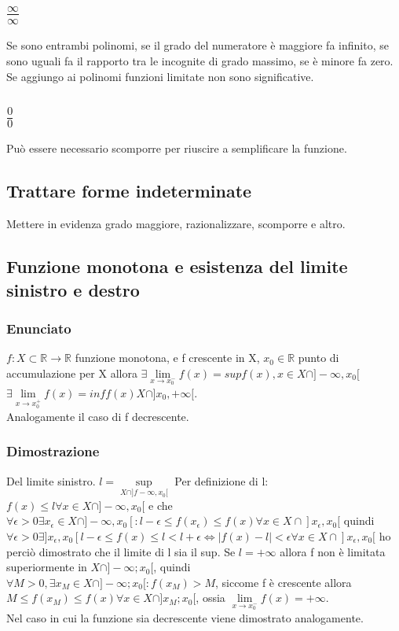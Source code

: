 \subsection{$\frac{\infty}{\infty}$}
Se sono entrambi polinomi, se il grado del numeratore \`e maggiore fa infinito, se sono uguali fa il rapporto tra le incognite di grado massimo, se \`e minore fa zero.
Se aggiungo ai polinomi funzioni limitate non sono significative.
\subsection{$\frac{0}{0}$}
Pu\`o essere necessario scomporre per riuscire a semplificare la funzione.
\subsection{Trattare forme indeterminate}
Mettere in evidenza grado maggiore, razionalizzare, scomporre e altro.
\subsection{Funzione monotona e esistenza del limite sinistro e destro}
\subsubsection{Enunciato}
$f:X\subset\mathbb{R}\rightarrow\mathbb{R}$ funzione monotona, e f crescente in X, $x_0\in\mathbb{R}$ punto di accumulazione per X allora $\exists\lim\limits_{x\rightarrow x^-_0}
f(x)=sup f(x), x\in X\cap]-\infty, x_0[$\\
$\exists\lim\limits_{x\rightarrow x^+_0}f(x)=inf f(x) X\cap]x_0,+\infty[$.\\
Analogamente il caso di f decrescente.\\
\subsubsection{Dimostrazione}
Del limite sinistro. $l=\sup\limits_{X\cap]f-\infty, x_0[}$ Per definizione di l: $f(x)\le l \forall x\in X\cap]-\infty, x_0[$ e che $\forall \epsilon>0\exists x_\epsilon\in X
\cap]-\infty, x_0[: l-\epsilon\le f(x_\epsilon)\le f(x) \forall x\in X\cap]x_\epsilon, x_0[$ quindi $\forall\epsilon>0 \exists ]x_\epsilon, x_0[ l-\epsilon \le f(x)\le l<l+\epsilon\Leftrightarrow|f(x)-l|<\epsilon \forall x\in X\cap ]x_\epsilon, x_0[$ ho perci\`o dimostrato che il limite di l sia il sup. Se $l=+\infty$ allora f non \`e limitata
superiormente in $X\cap]-\infty;x_0[$, quindi $\forall M>0,\exists x_M\in X\cap]-\infty;x_0[:f(x_M)>M$, siccome f \`e crescente allora $M\le f(x_M)\le f(x)\forall x\in 
X\cap]x_M;x_0[$, ossia $\lim\limits_{x\rightarrow x_0^-}f(x)=+\infty$.\\
Nel caso in cui la funzione sia decrescente viene dimostrato analogamente.
